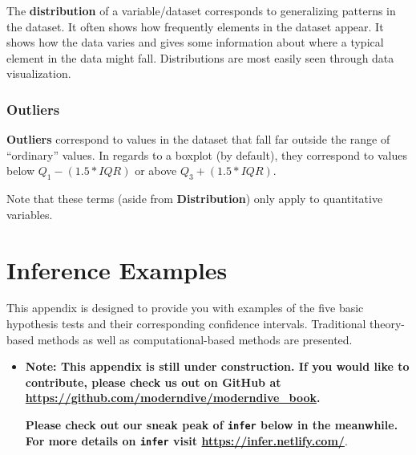 \documentclass[12pt,]{krantz}
\makeatletter
\newenvironment{Shaded}{\begin{snugshade}}{\end{snugshade}}
\newcommand{\KeywordTok}[1]{\textcolor[rgb]{0.27,0.27,0.27}{\textbf{#1}}}
\newcommand{\DataTypeTok}[1]{\textcolor[rgb]{0.27,0.27,0.27}{#1}}
\newcommand{\StringTok}[1]{\textcolor[rgb]{0.5,0.5,0.5}{#1}}
\newcommand{\NormalTok}[1]{#1}
\newenvironment{kframe}{%
\medskip{}
\setlength{\fboxsep}{.8em}
 \def\at@end@of@kframe{}%
 \ifinner\ifhmode%
  \def\at@end@of@kframe{\end{minipage}}%
  \begin{minipage}{\columnwidth}%
 \fi\fi%
 \def\FrameCommand##1{\hskip\@totalleftmargin \hskip-\fboxsep
 \colorbox{shadecolor}{##1}\hskip-\fboxsep
     \hskip-\linewidth \hskip-\@totalleftmargin \hskip\columnwidth}%
 \MakeFramed {\advance\hsize-\width
   \@totalleftmargin\z@ \linewidth\hsize
   \@setminipage}}%
 {\par\unskip\endMakeFramed%
 \at@end@of@kframe}
\renewenvironment{Shaded}{\begin{kframe}}{\end{kframe}}
\newenvironment{rmdblock}[1]
  {\begin{shaded*}
  \begin{itemize}
  \renewcommand{\labelitemi}{
    \raisebox{-.7\height}[0pt][0pt]{
    }
  }
  \item
  }
  {
  \end{itemize}
  \end{shaded*}
  }
\newenvironment{learncheck}
  {\begin{rmdblock}{warning}}
  {\end{rmdblock}}
\makeatother
\begin{document}
The \textbf{distribution} of a variable/dataset corresponds to
generalizing patterns in the dataset. It often shows how frequently
elements in the dataset appear. It shows how the data varies and gives
some information about where a typical element in the data might fall.
Distributions are most easily seen through data visualization.

\subsection{Outliers}\label{outliers}

\textbf{Outliers} correspond to values in the dataset that fall far
outside the range of ``ordinary'' values. In regards to a boxplot (by
default), they correspond to values below \(Q_1 - (1.5 * IQR)\) or above
\(Q_3 + (1.5 * IQR)\).

Note that these terms (aside from \textbf{Distribution}) only apply to
quantitative variables.

\chapter{Inference Examples}\label{appendixB}

This appendix is designed to provide you with examples of the five basic
hypothesis tests and their corresponding confidence intervals.
Traditional theory-based methods as well as computational-based methods
are presented.

\begin{learncheck}
\textbf{Note: This appendix is still under construction. If you would
like to contribute, please check us out on GitHub at
\url{https://github.com/moderndive/moderndive_book}.}

\textbf{Please check out our sneak peak of \texttt{infer} below in the
meanwhile. For more details on \texttt{infer} visit
\url{https://infer.netlify.com/}}.
\end{learncheck}

\begin{Shaded}
\end{Shaded}
\end{document}
